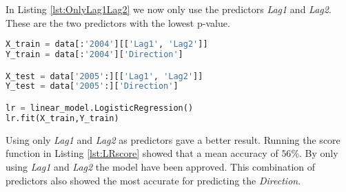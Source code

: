 In Listing \ref{lst:OnlyLag1Lag2} we now only use the predictors \emph{Lag1} and \emph{Lag2}. These are the two predictors with the lowest p-value. 

\begin{lstlisting}[language=Python, label=lst:OnlyLag1Lag2, caption=Logistic regression using only Lag1 and Lag2 as predictors]
X_train = data[:'2004'][['Lag1', 'Lag2']]
Y_train = data[:'2004']['Direction']

X_test = data['2005':][['Lag1', 'Lag2']]
Y_test = data['2005':]['Direction']

lr = linear_model.LogisticRegression()
lr.fit(X_train,Y_train)
\end{lstlisting}

Using only \emph{Lag1} and \emph{Lag2} as predictors gave a better result. Running the score function in Listing \ref{lst:LRscore} showed that a mean accuracy of $56\%$. By only using \emph{Lag1} and \emph{Lag2} the model have been approved. This combination of predictors also showed the most accurate for predicting the \emph{Direction}.







